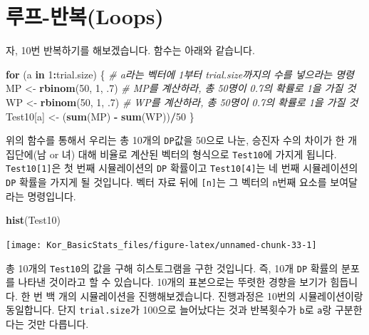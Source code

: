 \documentclass[]{book}
\newenvironment{Shaded}{\begin{snugshade}}{\end{snugshade}}
\newcommand{\CommentTok}[1]{\textcolor[rgb]{0.56,0.35,0.01}{\textit{#1}}}
\newcommand{\ControlFlowTok}[1]{\textcolor[rgb]{0.13,0.29,0.53}{\textbf{#1}}}
\newcommand{\DecValTok}[1]{\textcolor[rgb]{0.00,0.00,0.81}{#1}}
\newcommand{\FloatTok}[1]{\textcolor[rgb]{0.00,0.00,0.81}{#1}}
\newcommand{\KeywordTok}[1]{\textcolor[rgb]{0.13,0.29,0.53}{\textbf{#1}}}
\newcommand{\NormalTok}[1]{#1}
\newcommand{\OperatorTok}[1]{\textcolor[rgb]{0.81,0.36,0.00}{\textbf{#1}}}
\newcommand{\StringTok}[1]{\textcolor[rgb]{0.31,0.60,0.02}{#1}}
\begin{document}
\hypertarget{uxb8e8uxd504-uxbc18uxbcf5loops}{%
\section{루프-반복(Loops)}\label{uxb8e8uxd504-uxbc18uxbcf5loops}}

자, 10번 반복하기를 해보겠습니다. 함수는 아래와 같습니다.

\begin{Shaded}
\begin{Highlighting}[]
\ControlFlowTok{for}\NormalTok{ (a }\ControlFlowTok{in} \DecValTok{1}\OperatorTok{:}\NormalTok{trial.size) \{ }\CommentTok{# a라는 벡터에 1부터 trial.size까지의 수를 넣으라는 명령}
\NormalTok{  MP <-}\StringTok{ }\KeywordTok{rbinom}\NormalTok{(}\DecValTok{50}\NormalTok{, }\DecValTok{1}\NormalTok{, }\FloatTok{.7}\NormalTok{) }\CommentTok{# MP를 계산하라, 총 50명이 0.7의 확률로 1을 가질 것}
\NormalTok{  WP <-}\StringTok{ }\KeywordTok{rbinom}\NormalTok{(}\DecValTok{50}\NormalTok{, }\DecValTok{1}\NormalTok{, }\FloatTok{.7}\NormalTok{) }\CommentTok{# WP를 계산하라, 총 50명이 0.7의 확률로 1을 가질 것}
\NormalTok{  Test10[a] <-}\StringTok{ }\NormalTok{(}\KeywordTok{sum}\NormalTok{(MP) }\OperatorTok{-}\StringTok{ }\KeywordTok{sum}\NormalTok{(WP))}\OperatorTok{/}\DecValTok{50}
\NormalTok{\}}
\end{Highlighting}
\end{Shaded}

위의 함수를 통해서 우리는 총 10개의 \texttt{DP}값을 50으로 나눈, 승진자 수의 차이가 한 개 집단에(남 or 녀) 대해 비율로 계산된 벡터의 형식으로 \texttt{Test10}에 가지게 됩니다. \texttt{Test10{[}1{]}}은 첫 번째 시뮬레이션의 \texttt{DP} 확률이고 \texttt{Test10{[}4{]}}는 네 번째 시뮬레이션의 \texttt{DP} 확률을 가지게 될 것입니다. 벡터 자료 뒤에 \texttt{{[}n{]}}는 그 벡터의 \texttt{n}번째 요소를 보여달라는 명령입니다.

\begin{Shaded}
\begin{Highlighting}[]
\KeywordTok{hist}\NormalTok{(Test10)}
\end{Highlighting}
\end{Shaded}

\begin{center}\texttt{[image: Kor\_BasicStats\_files/figure-latex/unnamed-chunk-33-1]} \end{center}

총 10개의 \texttt{Test10}의 값을 구해 히스토그램을 구한 것입니다. 즉, 10개 \texttt{DP} 확률의 분포를 나타낸 것이라고 할 수 있습니다. 10개의 표본으로는 뚜렷한 경향을 보기가 힘듭니다. 한 번 백 개의 시뮬레이션을 진행해보겠습니다. 진행과정은 10번의 시뮬레이션이랑 동일합니다. 단지 \texttt{trial.size}가 100으로 늘어났다는 것과 반복횟수가 \texttt{b}로 \texttt{a}랑 구분한다는 것만 다릅니다.
\end{document}
